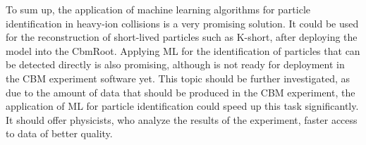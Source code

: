 To sum up, the application of machine learning algorithms for particle identification in heavy-ion collisions is a very promising solution. 
It  could be used for the reconstruction of short-lived particles such as K-short, after deploying the model into the CbmRoot. 
Applying ML for the identification of particles that can be detected directly is also promising, although is not ready for deployment in the CBM experiment software yet. 
This topic should be further investigated, as due to the amount of data that should be produced in the CBM experiment, the application of ML for particle identification could speed up this task significantly. 
It should offer physicists, who analyze the results of the experiment, faster access to data of better quality.
